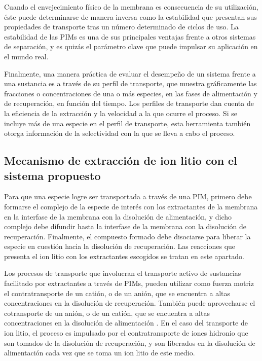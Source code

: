Cuando el envejecimiento físico de la membrana es consecuencia de su utilización, éste puede determinarse de manera inversa como la estabilidad que presentan sus propiedades de transporte tras un número determinado de ciclos de uso.  La estabilidad de las PIMs es una de sus principales ventajas frente a otros sistemas de separación, y es quizás el parámetro clave que puede impulsar su aplicación en el mundo real. 

Finalmente, una manera práctica de evaluar el desempeño de un sistema frente a una sustancia es a través de su perfil de transporte,  que muestra gráficamente las fracciones o concentraciones de una o más especies, en las fases de alimentación y de recuperación, en función del tiempo. Los perfiles de transporte dan cuenta de la eficiencia de la extracción y la velocidad a la que ocurre el proceso. Si se incluye más de una especie en el perfil de transporte, esta herramienta también otorga información de la selectividad con la que se lleva a cabo el proceso.


\subsection{Mecanismo de extracción de ion litio con el sistema propuesto}
Para que una especie logre ser transportada a través de una \ac{PIM}, primero debe formarse el complejo de la especie de interés con los extractantes de la membrana en la interfase de la membrana con la disolución de alimentación, y dicho complejo debe difundir hasta la interfase de la membrana con la disolución de recuperación. Finalmente, el compuesto formado debe disociarse para liberar la especie en cuestión hacia la disolución de recuperación. Las reacciones que presenta el ion litio con los extractantes escogidos se tratan en este apartado.

Los procesos de transporte que involucran el transporte activo de sustancias facilitado por extractantes a través de PIMs, pueden utilizar como fuerza motriz el contratransporte de un catión, o de un anión, que se encuentra a altas concentraciones en la disolución de recuperación. También puede aprovecharse el cotransporte de un anión, o de un catión, que se encuentra a altas concentraciones en la disolución de alimentación \citep{Nghiem2006}. En el caso del transporte de ion litio, el proceso es impulsado por el contratransporte de iones hidronio que son tomados de la disolución de recuperación, y son liberados en la disolución de alimentación cada vez que se toma un ion litio de este medio.

